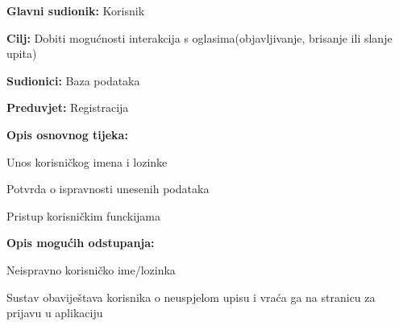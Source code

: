 					\noindent {}
					\begin{packed_item}
	
						\item \textbf{Glavni sudionik: }Korisnik
						\item  \textbf{Cilj:} Dobiti mogućnosti interakcija s oglasima(objavljivanje, brisanje ili slanje upita)
						\item  \textbf{Sudionici:} Baza podataka
						\item  \textbf{Preduvjet:} Registracija
						\item  \textbf{Opis osnovnog tijeka:}
						
						\item[] \begin{packed_enum}
	
							\item Unos korisničkog imena i lozinke
							\item Potvrda o ispravnosti unesenih podataka
							\item Pristup korisničkim funckijama
							
						\end{packed_enum}
						
						\item  \textbf{Opis mogućih odstupanja:}
						
						\item[] \begin{packed_item}
	
							\item[2.a] Neispravno korisničko ime/lozinka
							\item[] \begin{packed_enum}
								
								\item Sustav obaviještava korisnika o neuspjelom upisu i vraća ga na stranicu za prijavu u aplikaciju

								
							\end{packed_enum}
						\end{packed_item}
					\end{packed_item}
					
